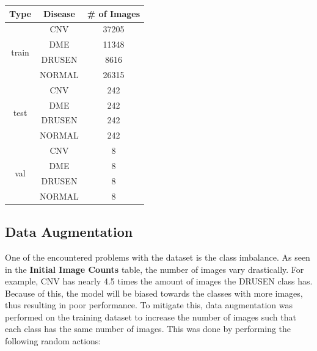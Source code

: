 \documentclass[11pt]{article}
\begin{document}
\begin{center}
    \begin{tabular}{|c|c|c|}
        \hline
        \textbf{Type}          & \textbf{Disease} & \textbf{\# of Images} \\
        \hline
        \multirow{4}{*}{train} & CNV              & 37205                 \\ \cline{2-3}
                               & DME              & 11348                 \\ \cline{2-3}
                               & DRUSEN           & 8616                  \\ \cline{2-3}
                               & NORMAL           & 26315                 \\
        \hline
        \multirow{4}{*}{test}  & CNV              & 242                   \\ \cline{2-3}
                               & DME              & 242                   \\ \cline{2-3}
                               & DRUSEN           & 242                   \\ \cline{2-3}
                               & NORMAL           & 242                   \\
        \hline
        \multirow{4}{*}{val}   & CNV              & 8                     \\ \cline{2-3}
                               & DME              & 8                     \\ \cline{2-3}
                               & DRUSEN           & 8                     \\ \cline{2-3}
                               & NORMAL           & 8                     \\
        \hline
    \end{tabular}
\end{center}

\subsection{Data Augmentation}

One of the encountered problems with the dataset is the class imbalance. As seen in the \textbf{Initial Image Counts} table, the number of images vary drastically. For example, CNV has nearly 4.5 times the amount of images the DRUSEN class has. Because of this, the model will be biased towards the classes with more images, thus resulting in poor performance. To mitigate this, data augmentation was performed on the training dataset to increase the number of images such that each class has the same number of images. This was done by performing the following random actions:
\end{document}
